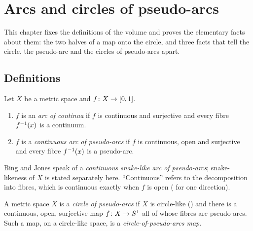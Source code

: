 \chapter{Arcs and circles of pseudo-arcs}\label{ch:circles}

This chapter fixes the definitions of the volume and proves the elementary facts about them: the two halves of a map onto the circle, and three
facts that tell the circle, the pseudo-arc and the circles of pseudo-arcs apart.

\section{Definitions}

\begin{definition}\label{def:arc-continua}
Let $X$ be a metric space and $f\colon X\to[0,1]$.
\begin{enumerate}[label=(\alph*)]
\item $f$ is an \emph{arc of continua} if $f$ is continuous and surjective and every fibre $f^{-1}(x)$ is a continuum.
\item $f$ is a \emph{continuous arc of pseudo-arcs} if $f$ is continuous, open and surjective and every fibre $f^{-1}(x)$ is a pseudo-arc.
\end{enumerate}
\end{definition}


Bing and Jones speak of a \emph{continuous snake-like arc of pseudo-arcs}; snake-likeness of $X$ is stated separately here. ``Continuous'' refers to
the decomposition into fibres, which is continuous exactly when $f$ is open ( for one direction).

\begin{definition}\label{def:circle-pa}
A metric space $X$ is a \emph{circle of pseudo-arcs} if $X$ is circle-like () and there is a continuous, open, surjective map
$f\colon X\to S^1$ all of whose fibres are pseudo-arcs. Such a map, on a circle-like space, is a \emph{circle-of-pseudo-arcs map}.
\end{definition}


